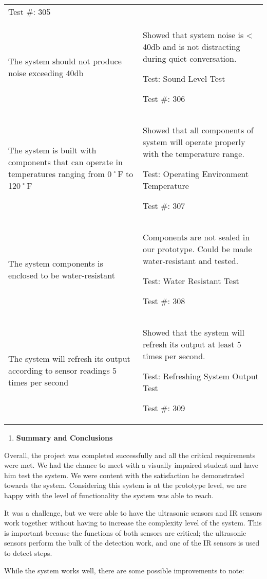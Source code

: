 \begin{longtable}[]{@{}
  >{\raggedright\arraybackslash}p{}
  >{\raggedright\arraybackslash}p{}@{}}
Test \#: 305 \\
The system should not produce noise exceeding 40db & Showed that system
noise is \textless{} 40db and is not distracting during quiet
conversation.

Test: Sound Level Test

Test \#: 306 \\
The system is built with components that can operate in temperatures
ranging from 0˚F to 120˚F & Showed that all components of system will
operate properly with the temperature range.

Test: Operating Environment Temperature

Test \#: 307 \\
The system components is enclosed to be water-resistant & Components are
not sealed in our prototype. Could be made water-resistant and tested.

Test: Water Resistant Test

Test \#: 308 \\
The system will refresh its output according to sensor readings 5 times
per second & Showed that the system will refresh its output at least 5
times per second.

Test: Refreshing System Output Test

Test \#: 309 \\
\end{longtable}

\begin{enumerate}
\def\labelenumi{\arabic{enumi}.}
\setcounter{enumi}{3}
\item
  \textbf{Summary and Conclusions}
\end{enumerate}

Overall, the project was completed successfully and all the critical
requirements were met. We had the chance to meet with a visually
impaired student and have him test the system. We were content with the
satisfaction he demonstrated towards the system. Considering this system
is at the prototype level, we are happy with the level of functionality
the system was able to reach.

It was a challenge, but we were able to have the ultrasonic sensors and
IR sensors work together without having to increase the complexity level
of the system. This is important because the functions of both sensors
are critical; the ultrasonic sensors perform the bulk of the detection
work, and one of the IR sensors is used to detect steps.

While the system works well, there are some possible improvements to
note:

